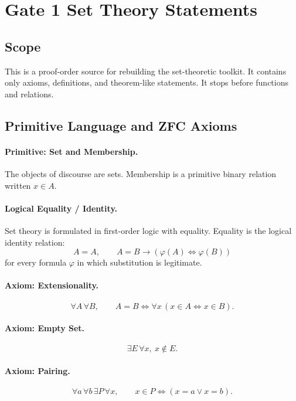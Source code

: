 
\section*{Gate 1 Set Theory Statements}

\subsection*{Scope}

This is a proof-order source for rebuilding the set-theoretic toolkit.  It
contains only axioms, definitions, and theorem-like statements.  It stops before
functions and relations.

\subsection*{Primitive Language and ZFC Axioms}

\paragraph{Primitive: Set and Membership.}
The objects of discourse are sets.  Membership is a primitive binary relation
written \(x\in A\).

\paragraph{Logical Equality / Identity.}
Set theory is formulated in first-order logic with equality.  Equality is the
logical identity relation:
\[
  A=A,
  \qquad
  A=B\to(\varphi(A)\Longleftrightarrow \varphi(B))
\]
for every formula \(\varphi\) in which substitution is legitimate.

\paragraph{Axiom: Extensionality.}
\[
  \forall A\,\forall B,\qquad
  A=B \Longleftrightarrow \forall x\,(x\in A\Longleftrightarrow x\in B).
\]

\paragraph{Axiom: Empty Set.}
\[
  \exists E\,\forall x,\ x\notin E.
\]

\paragraph{Axiom: Pairing.}
\[
  \forall a\,\forall b\,\exists P\,\forall x,\qquad
  x\in P \Longleftrightarrow (x=a\lor x=b).
\]

